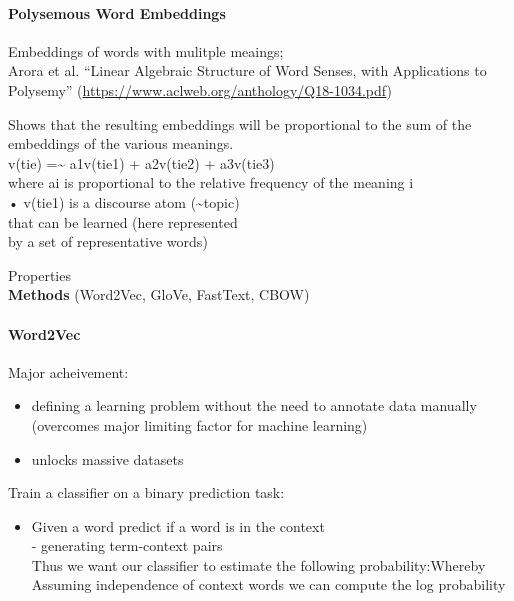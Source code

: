 \documentclass[
]{article}
\providecommand{\tightlist}{%
  \setlength{\itemsep}{0pt}\setlength{\parskip}{0pt}}
\begin{document}
\hypertarget{polysemous-word-embeddings}{%
\paragraph{Polysemous Word
Embeddings}\label{polysemous-word-embeddings}}

Embeddings of words with mulitple meaings;\\
Arora et al. ``Linear Algebraic Structure of Word Senses, with
Applications to Polysemy''
(\url{https://www.aclweb.org/anthology/Q18-1034.pdf})

Shows that the resulting embeddings will be proportional to the sum of
the embeddings of the various meanings.\\
v(tie) =\textasciitilde{} a1v(tie1) + a2v(tie2) + a3v(tie3)\\
where ai is proportional to the relative frequency of the meaning i\\
• v(tie1) is a discourse atom (\textasciitilde topic)\\
that can be learned (here represented\\
by a set of representative words)

Properties\\
\textbf{Methods} (Word2Vec, GloVe, FastText, CBOW)

\hypertarget{word2vec}{%
\paragraph{Word2Vec}\label{word2vec}}

Major acheivement:

\begin{itemize}
\tightlist
\item
  defining a learning problem without the need to annotate data manually
  (overcomes major limiting factor for machine learning)
\item
  unlocks massive datasets
\end{itemize}

Train a classifier on a binary prediction task:

\begin{itemize}
\tightlist
\item
  Given a word {} predict if a word {} is in the context\\
  - generating term-context {} pairs\\
  Thus we want our classifier to estimate the following
  probability:{}Whereby {}{}Assuming independence of context words we
  can compute the log probability\\
  {}
\end{itemize}
\end{document}
